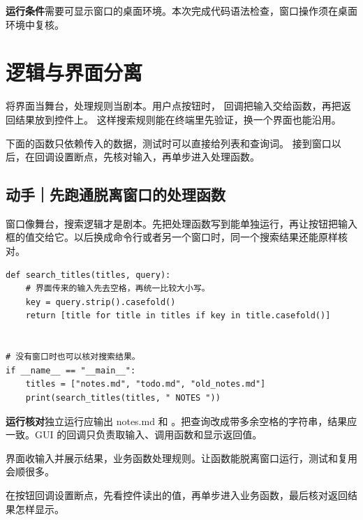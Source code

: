 \textbf{运行条件}\enspace 需要可显示窗口的桌面环境。本次完成代码语法检查，窗口操作须在桌面环境中复核。


\section{逻辑与界面分离}

将界面当舞台，处理规则当剧本。用户点按钮时，
回调把输入交给函数，再把返回结果放到控件上。
这样搜索规则能在终端里先验证，换一个界面也能沿用。

下面的函数只依赖传入的数据，测试时可以直接给列表和查询词。
接到窗口以后，在回调设置断点，先核对输入，再单步进入处理函数。

\subsection*{动手｜先跑通脱离窗口的处理函数}

窗口像舞台，搜索逻辑才是剧本。先把处理函数写到能单独运行，再让按钮把输入框的值交给它。以后换成命令行或者另一个窗口时，同一个搜索结果还能原样核对。

\begin{lstlisting}[title={\code{search_titles.py}}]
def search_titles(titles, query):
    # 界面传来的输入先去空格，再统一比较大小写。
    key = query.strip().casefold()
    return [title for title in titles if key in title.casefold()]


# 没有窗口时也可以核对搜索结果。
if __name__ == "__main__":
    titles = ["notes.md", "todo.md", "old_notes.md"]
    print(search_titles(titles, " NOTES "))
\end{lstlisting}

\textbf{运行核对}\enspace 独立运行应输出 notes.md 和 。把查询改成带多余空格的字符串，结果应一致。GUI 的回调只负责取输入、调用函数和显示返回值。

\begin{myunderstanding}
界面收输入并展示结果，业务函数处理规则。让函数能脱离窗口运行，测试和复用会顺很多。
\end{myunderstanding}

\begin{pycharmpractice}
在按钮回调设置断点，先看控件读出的值，再单步进入业务函数，最后核对返回结果怎样显示。
\end{pycharmpractice}

